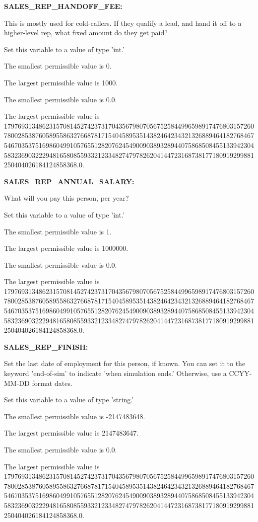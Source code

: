 \textbf{SALES\_REP\_HANDOFF\_FEE:}


This is mostly used for cold-callers.  If they qualify a lead, and hand it off to a higher-level rep, what fixed amount do they get paid?

Set this variable to a value of type 'int.'

The smallest permissible value is 0.

The largest permissible value is 1000.

The smallest permissible value is 0.0.

The largest permissible value is 179769313486231570814527423731704356798070567525844996598917476803157260780028538760589558632766878171540458953514382464234321326889464182768467546703537516986049910576551282076245490090389328944075868508455133942304583236903222948165808559332123348274797826204144723168738177180919299881250404026184124858368.0.


\textbf{SALES\_REP\_ANNUAL\_SALARY:}


What will you pay this person, per year?

Set this variable to a value of type 'int.'

The smallest permissible value is 1.

The largest permissible value is 1000000.

The smallest permissible value is 0.0.

The largest permissible value is 179769313486231570814527423731704356798070567525844996598917476803157260780028538760589558632766878171540458953514382464234321326889464182768467546703537516986049910576551282076245490090389328944075868508455133942304583236903222948165808559332123348274797826204144723168738177180919299881250404026184124858368.0.


\textbf{SALES\_REP\_FINISH:}


Set the last date of employment for this person, if known.  You can set it to the keyword 'end-of-sim' to indicate 'when simulation ends.'  Otherwise, use a CCYY-MM-DD format dates.

Set this variable to a value of type 'string.'

The smallest permissible value is -2147483648.

The largest permissible value is 2147483647.

The smallest permissible value is 0.0.

The largest permissible value is 179769313486231570814527423731704356798070567525844996598917476803157260780028538760589558632766878171540458953514382464234321326889464182768467546703537516986049910576551282076245490090389328944075868508455133942304583236903222948165808559332123348274797826204144723168738177180919299881250404026184124858368.0.


